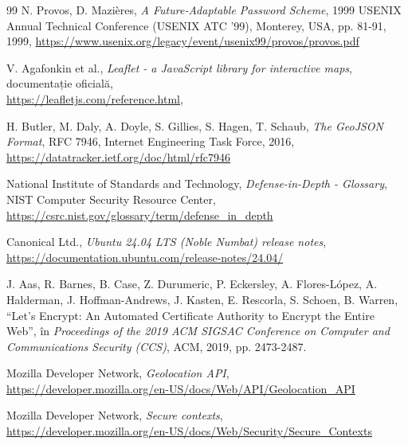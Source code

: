 ﻿\documentclass[12pt, a4paper, twoside, romanian]{teza-upb}
\begin{document}
\begin{thebibliography}{99}
N. Provos, D. Mazières,
\emph{A Future-Adaptable Password Scheme},
1999 USENIX Annual Technical Conference (USENIX ATC '99), Monterey, USA,
pp. 81-91, 1999,
\url{https://www.usenix.org/legacy/event/usenix99/provos/provos.pdf}



V. Agafonkin et al.,
\textit{Leaflet - a JavaScript library for interactive maps},
documentație oficială,
\\\url{https://leafletjs.com/reference.html},


H. Butler, M. Daly, A. Doyle, S. Gillies, S. Hagen, T. Schaub,
\textit{The GeoJSON Format},
RFC 7946, Internet Engineering Task Force, 2016,
\\\url{https://datatracker.ietf.org/doc/html/rfc7946}



National Institute of Standards and Technology,
\emph{Defense-in-Depth - Glossary},
NIST Computer Security Resource Center,
\url{https://csrc.nist.gov/glossary/term/defense_in_depth}




Canonical Ltd.,
\emph{Ubuntu 24.04 LTS (Noble Numbat) release notes},
\url{https://documentation.ubuntu.com/release-notes/24.04/}


J. Aas, R. Barnes, B. Case, Z. Durumeric, P. Eckersley, A. Flores-López,
A. Halderman, J. Hoffman-Andrews, J. Kasten, E. Rescorla, S. Schoen,
B. Warren,
``Let's Encrypt: An Automated Certificate Authority to Encrypt the Entire Web'',
în \textit{Proceedings of the 2019 ACM SIGSAC Conference on Computer
and Communications Security (CCS)}, ACM, 2019, pp. 2473-2487.


Mozilla Developer Network,
\textit{Geolocation API},
\\\url{https://developer.mozilla.org/en-US/docs/Web/API/Geolocation_API}



Mozilla Developer Network,
\textit{Secure contexts},
\\\url{https://developer.mozilla.org/en-US/docs/Web/Security/Secure_Contexts}















\end{thebibliography}
\clearpage
\thispagestyle{empty}
\mbox{}
\clearpage
 



\end{document}
